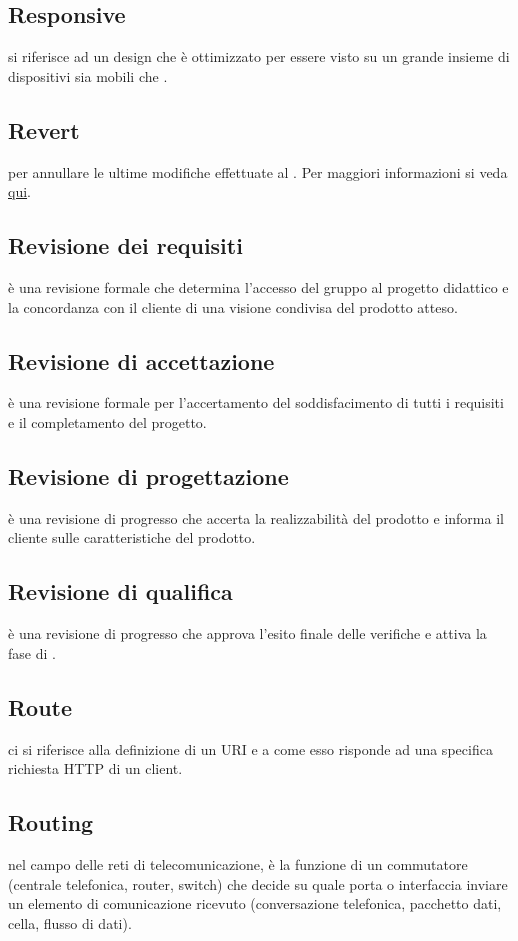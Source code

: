 \documentclass[12pt,a4paper]{article}
\begin{document}
\subsection{Responsive} 
si riferisce ad un design che è ottimizzato per essere visto su un grande insieme di dispositivi sia mobili che .

\subsection{Revert} 
per annullare le ultime modifiche effettuate al . Per maggiori informazioni si veda \href{https://git-scm.com/docs/}{qui}.

\subsection{Revisione dei requisiti} 
è una revisione formale che determina l'accesso del gruppo al progetto didattico e la concordanza con il cliente di una visione condivisa del prodotto atteso.

\subsection{Revisione di accettazione} 
è una revisione formale per l'accertamento del soddisfacimento di tutti i requisiti e il completamento del progetto.

\subsection{Revisione di progettazione} 
è una revisione di progresso che accerta la realizzabilità del prodotto e informa il cliente sulle caratteristiche del prodotto.

\subsection{Revisione di qualifica} 
è una revisione di progresso che approva l'esito finale delle verifiche e attiva la fase di .

\subsection{Route} 
ci si riferisce alla definizione di un URI e a come esso risponde ad una specifica richiesta HTTP di un client.

\subsection{Routing} 
nel campo delle reti di telecomunicazione, è la funzione di un commutatore (centrale telefonica, router, switch) che decide su quale porta o interfaccia inviare un elemento di comunicazione ricevuto (conversazione telefonica, pacchetto dati, cella, flusso di dati).
\end{document}
